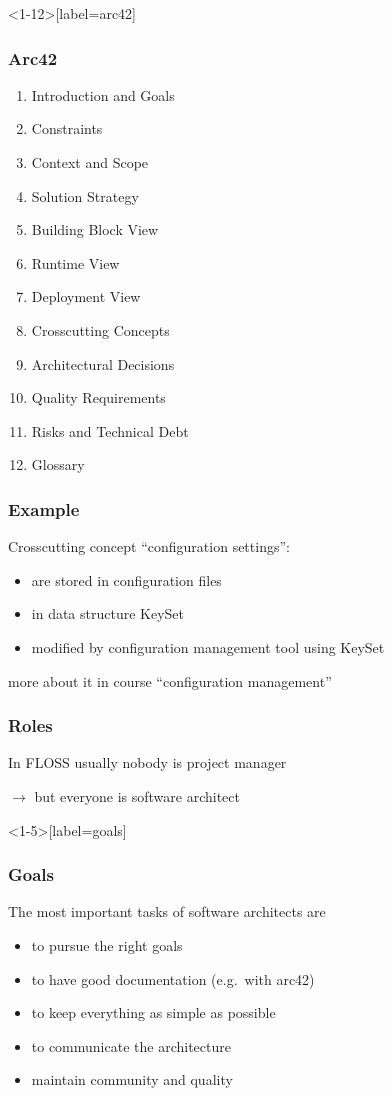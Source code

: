 \begin{frame}<1-12>[label=arc42]
	\frametitle{Arc42}
	\begin{enumerate}[<+-| alert@+>]
	\item Introduction and Goals
	\item Constraints
	\item Context and Scope
	\item Solution Strategy
	\item Building Block View
	\item Runtime View
	\item Deployment View
	\item Crosscutting Concepts
	\item Architectural Decisions~\cite{zdun2007patterns}
	\item Quality Requirements
	\item Risks and Technical Debt
	\item Glossary
	\end{enumerate}
\end{frame}

\begin{frame}
	\frametitle{Example}

	Crosscutting concept ``configuration settings'':

	\begin{itemize}
	\item are stored in configuration files
	\item in data structure KeySet
	\item modified by configuration management tool using KeySet
	\end{itemize}

	more about it in course ``configuration management''
\end{frame}

\begin{frame}
	\frametitle{Roles}

	In FLOSS usually nobody is project manager

	\pause

	$\rightarrow$ but everyone is software architect
\end{frame}

\begin{frame}<1-5>[label=goals]
	\frametitle{Goals}

	The most important tasks of software architects are

	\begin{itemize}[<+-| alert@+>]
	\item to pursue the right goals
	\item to have good documentation (e.g.\ with arc42)
	\item to keep everything as simple as possible
	\item to communicate the architecture
	\item maintain community and quality
	\end{itemize}
\end{frame}

